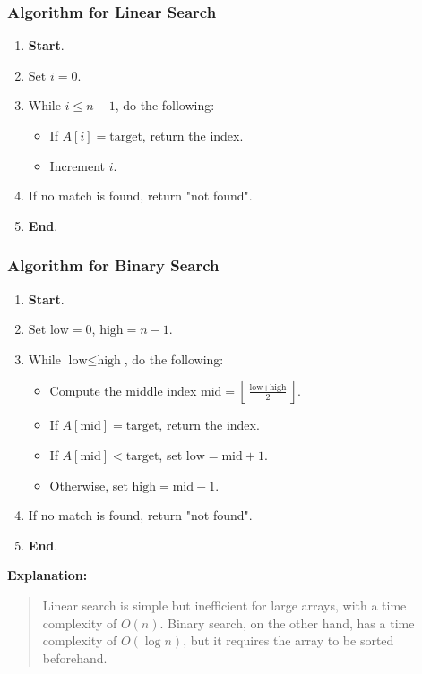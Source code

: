\documentclass[12pt, oneside]{book}
\begin{document}
\subsubsection*{Algorithm for Linear Search}

\begin{enumerate}
	\item \textbf{Start}.
	\item Set $i = 0$.
	\item While $i \leq n - 1$, do the following:
	\begin{itemize}
		\item If $A[i] = \text{target}$, return the index.
		\item Increment $i$.
	\end{itemize}
	\item If no match is found, return "not found".
	\item \textbf{End}.
\end{enumerate}

\subsubsection*{Algorithm for Binary Search}

\begin{enumerate}
	\item \textbf{Start}.
	\item Set $\text{low} = 0$, $\text{high} = n - 1$.
	\item While $\text{low} \leq \text{high}$, do the following:
	\begin{itemize}
		\item Compute the middle index $\text{mid} = \left\lfloor \frac{\text{low} + \text{high}}{2} \right\rfloor$.
		\item If $A[\text{mid}] = \text{target}$, return the index.
		\item If $A[\text{mid}] < \text{target}$, set $\text{low} = \text{mid} + 1$.
		\item Otherwise, set $\text{high} = \text{mid} - 1$.
	\end{itemize}
	\item If no match is found, return "not found".
	\item \textbf{End}.
\end{enumerate}

\textbf{Explanation:}
\begin{quote}
	Linear search is simple but inefficient for large arrays, with a time complexity of $O(n)$. Binary search, on the other hand, has a time complexity of $O(\log n)$, but it requires the array to be sorted beforehand.
\end{quote}
\end{document}
